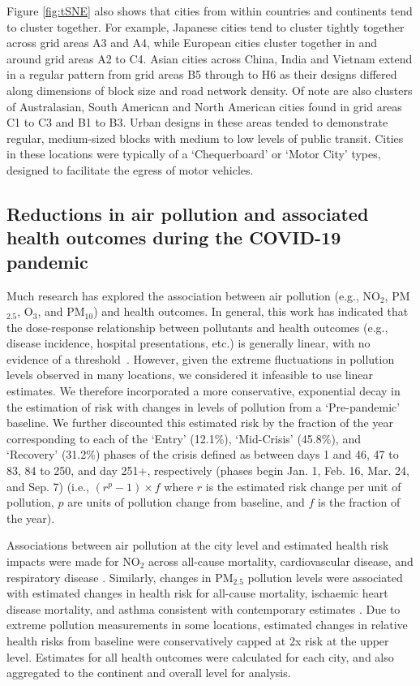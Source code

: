 \documentclass[preprint,10pt]{elsarticle} %
\begin{document}
Figure \ref{fig:tSNE} also shows that cities from within countries and continents tend to cluster together. For example, Japanese cities tend to cluster tightly together across grid areas A3 and A4, while European cities cluster together in and around grid areas A2 to C4. Asian cities across China, India and Vietnam extend in a regular pattern from grid areas B5 through to H6 as their designs differed along dimensions of block size and road network density. Of note are also clusters of Australasian, South American and North American cities found in grid areas C1 to C3 and B1 to B3. Urban designs in these areas tended to demonstrate regular, medium-sized blocks with medium to low levels of public transit. Cities in these locations were typically of a `Chequerboard' or `Motor City' types, designed to facilitate the egress of motor vehicles.

\subsection*{Reductions in air pollution and associated health outcomes during the COVID-19 pandemic}
Much research has explored the association between air pollution (e.g., NO$_{2}$, PM$_{2.5}$, O$_{3}$, and PM$_{10}$) and health outcomes. In general, this work has indicated that the dose-response relationship between pollutants and health outcomes (e.g., disease incidence, hospital presentations, etc.) is generally linear, with no evidence of a threshold~\cite{schwartz2002concentration}. However, given the extreme fluctuations in pollution levels observed in many locations, we considered it infeasible to use linear estimates. We therefore incorporated a more conservative, exponential decay in the estimation of risk with changes in levels of pollution from a `Pre-pandemic' baseline. We further discounted this estimated risk by the fraction of the year corresponding to each of the `Entry' (12.1\%), `Mid-Crisis' (45.8\%), and `Recovery' (31.2\%) phases of the crisis defined as between days 1 and 46, 47 to 83, 84 to 250, and day 251+, respectively (phases begin Jan. 1, Feb. 16, Mar. 24, and Sep. 7) (i.e., $(r^{p}-1) \times f$ where $r$ is the estimated risk change per unit of pollution, $p$ are units of pollution change from baseline, and $f$ is the fraction of the year). 

Associations between air pollution at the city level and estimated health risk impacts were made for NO$_{2}$ across all-cause mortality, cardiovascular disease, and respiratory disease \cite{Huang19Pollution}. Similarly, changes in PM$_{2.5}$ pollution levels were associated with estimated changes in health risk for all-cause mortality, ischaemic heart disease mortality, and asthma consistent with contemporary estimates \cite{Xie257, Yu2020PM2.5, BALTI2014161}. Due to extreme pollution measurements in some locations, estimated changes in relative health risks from baseline were conservatively capped at 2x risk at the upper level. Estimates for all health outcomes were calculated for each city, and also aggregated to the continent and overall level for analysis. 
\end{document}
